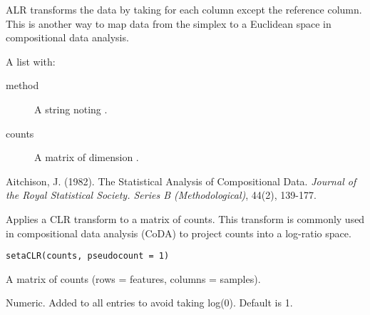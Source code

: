\documentclass[a4paper]{book}
\begin{document}
%
\begin{Details}
ALR transforms the data by taking  for each column
 except the reference column. This is another way to map data from
the simplex to a Euclidean space in compositional data analysis.
\end{Details}
%
\begin{Value}
A list with:
\begin{description}

\item[method] A string noting .
\item[counts] A matrix of dimension .

\end{description}

\end{Value}
%
\begin{References}
Aitchison, J. (1982). The Statistical Analysis of Compositional Data.
\emph{Journal of the Royal Statistical Society. Series B (Methodological)}, 44(2), 139-177.
\end{References}
%
\begin{Examples}
\end{Examples}
%
\begin{Description}
Applies a CLR transform to a matrix of counts.
This transform is commonly used in compositional data analysis (CoDA)
to project counts into a log-ratio space.
\end{Description}
%
\begin{Usage}
\begin{verbatim}
setaCLR(counts, pseudocount = 1)
\end{verbatim}
\end{Usage}
%
\begin{Arguments}
\begin{ldescription}
\item[\code{counts}] A matrix of counts (rows = features, columns = samples).

\item[\code{pseudocount}] Numeric.
Added to all entries to avoid taking log(0). Default is 1.
\end{ldescription}
\end{Arguments}
\end{document}
